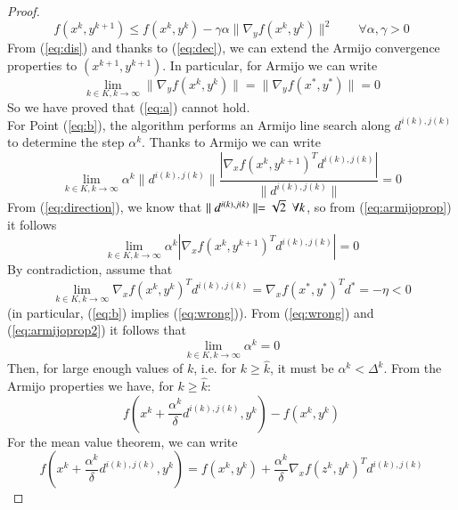 \begin{proof}
\begin{equation}
f(x^{k}, y^{k+1}) \leq f(x^{k}, y^{k}) - \gamma \alpha \parallel \nabla_y f(x^{k}, y^{k}) \parallel ^2 \qquad \forall \alpha, \gamma > 0
\end{equation}
From (\ref{eq:dis}) and thanks to (\ref{eq:dec}), we can extend the Armijo convergence properties to $(x^{k+1}, y^{k+1})$. In particular, for Armijo we can write
\begin{equation}
\lim_{k \in K, k \rightarrow \infty} \parallel \nabla_y f(x^{k}, y^{k}) \parallel =  \parallel \nabla_y f(x^{*}, y^{*}) \parallel = 0
\end{equation}
So we have proved that (\ref{eq:a}) cannot hold.\\
For Point (\ref{eq:b}), the algorithm performs an Armijo line search along $d^{i(k),j(k)}$ to determine the step $\alpha^{k}$. Thanks to Armijo we can write
\begin{equation}\label{eq:armijoprop}
\lim_{k \in K, k \rightarrow \infty} \alpha^{k} \parallel d^{i(k),j(k)} \parallel \frac{ \left| \nabla_x f(x^{k}, y^{k+1})^T d^{i(k),j(k)} \right|}{\parallel d^{i(k),j(k)} \parallel} = 0
\end{equation}
From (\ref{eq:direction}), we know that $\parallel d^{i(k),j(k)} \parallel = \sqrt{2} \enskip\forall k$, so from (\ref{eq:armijoprop}) it follows
\begin{equation}\label{eq:armijoprop2}
\lim_{k \in K, k \rightarrow \infty} \alpha^{k}  \left| \nabla_x f(x^{k}, y^{k+1})^T d^{i(k),j(k)} \right| = 0
\end{equation}
By contradiction, assume that 
\begin{equation}\label{eq:wrong}
\lim_{k \in K, k \rightarrow \infty} \nabla_x f(x^k, y^k)^T d^{i(k),j(k)} = \nabla_x f(x^*, y^*)^T d^* = -\eta < 0
\end{equation}
(in particular, (\ref{eq:b}) implies (\ref{eq:wrong})).
From (\ref{eq:wrong}) and (\ref{eq:armijoprop2}) it follows that
\begin{equation}\label{eq:alpha}
\lim_{k \in K, k \rightarrow \infty} \alpha^k = 0
\end{equation}
Then, for large enough values of $k$, i.e. for $k \geq \hat{k}$, it must be $\alpha^k < \Delta^k$. From the Armijo properties we have, for $k \geq \hat{k}$:
\begin{equation}\label{eq:arm1}
f(x^k + \frac{\alpha^k}{\delta} d^{i(k),j(k)}, y^k) - f(x^k,y^k) 
\end{equation}
For the mean value theorem, we can write
\begin{equation}\label{eq:arm2}
f(x^k + \frac{\alpha^k}{\delta} d^{i(k),j(k)}, y^k) = f(x^k, y^k) + \frac{\alpha^k}{\delta} \nabla_x f(z^k, y^k)^T d^{i(k),j(k)}

\end{equation}
\end{proof}
